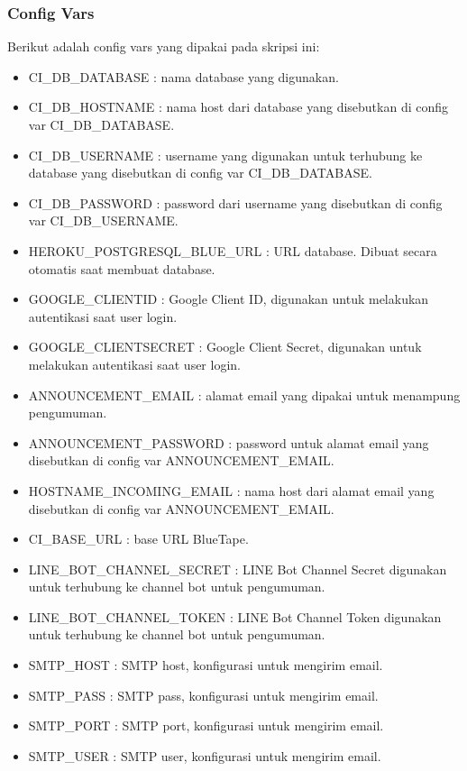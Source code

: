 	\subsubsection{Config Vars}
			Berikut adalah config vars yang dipakai pada skripsi ini: 
		\begin{itemize}
			\item CI\_DB\_DATABASE : nama database yang digunakan.
			\item CI\_DB\_HOSTNAME : nama host dari database yang disebutkan di config var CI\_DB\_DATABASE.
			\item CI\_DB\_USERNAME : username yang digunakan untuk terhubung ke database yang disebutkan di config var CI\_DB\_DATABASE.
			\item CI\_DB\_PASSWORD : password dari username yang disebutkan di config var CI\_DB\_USERNAME.
			\item HEROKU\_POSTGRESQL\_BLUE\_URL : URL database. Dibuat secara otomatis saat membuat database.
			\item GOOGLE\_CLIENTID : Google Client ID, digunakan untuk melakukan autentikasi saat user login.
			\item GOOGLE\_CLIENTSECRET : Google Client Secret, digunakan untuk melakukan autentikasi saat user login.
			\item ANNOUNCEMENT\_EMAIL : alamat email yang dipakai untuk menampung pengumuman.
			\item ANNOUNCEMENT\_PASSWORD : password untuk alamat email yang disebutkan di config var ANNOUNCEMENT\_EMAIL.
			\item HOSTNAME\_INCOMING\_EMAIL : nama host dari alamat email yang disebutkan di config var ANNOUNCEMENT\_EMAIL.
			\item CI\_BASE\_URL : base URL BlueTape.
			\item LINE\_BOT\_CHANNEL\_SECRET : LINE Bot Channel Secret digunakan untuk terhubung ke channel bot untuk pengumuman.
			\item LINE\_BOT\_CHANNEL\_TOKEN : LINE Bot Channel Token digunakan untuk terhubung ke channel bot untuk pengumuman.
			\item SMTP\_HOST : SMTP host, konfigurasi untuk mengirim email.
			\item SMTP\_PASS : SMTP pass, konfigurasi untuk mengirim email.
			\item SMTP\_PORT : SMTP port, konfigurasi untuk mengirim email.
			\item SMTP\_USER : SMTP user, konfigurasi untuk mengirim email.
		\end{itemize}
		
